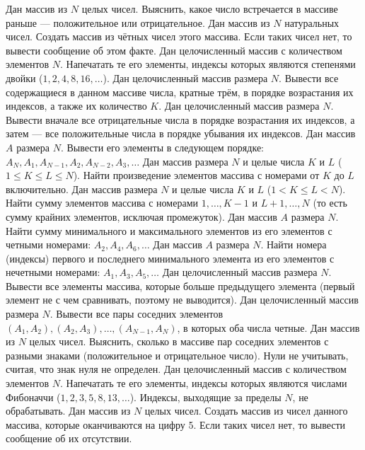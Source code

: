 Дан массив из $N$ целых чисел. Выяснить, какое число встречается в массиве раньше --- положительное или отрицательное.
Дан массив из $N$ натуральных чисел. Создать массив из чётных чисел этого массива. Если таких чисел нет, то вывести сообщение об этом факте.
Дан целочисленный массив с количеством элементов $N$. Напечатать те его элементы, индексы которых являются степенями двойки ($1, 2, 4, 8, 16, \dots$).
Дан целочисленный массив размера $N$. Вывести все содержащиеся в данном массиве числа, кратные трём, в порядке возрастания их индексов, а также их количество $K$.
Дан целочисленный массив размера $N$. Вывести вначале все отрицательные числа в порядке возрастания их индексов, а затем --- все положительные числа в порядке убывания их индексов.
Дан массив $A$ размера $N$. Вывести его элементы в следующем порядке: $A_N, A_1, A_{N-1}, A_2, A_{N-2}, A_3, \dots$
Дан массив размера $N$ и целые числа $K$ и $L$ ($1 \leq K \leq L \leq N$). Найти произведение элементов массива с номерами от $K$ до $L$ включительно.
Дан массив размера $N$ и целые числа $K$ и $L$ ($1 < K \leq L < N$). Найти сумму элементов массива с номерами $1, \dots, K-1$ и $L+1, \dots, N$ (то есть сумму крайних элементов, исключая промежуток).
Дан массив $A$ размера $N$. Найти сумму минимального и максимального элементов из его элементов с четными номерами: $A_2, A_4, A_6, \dots$
Дан массив $A$ размера $N$. Найти номера (индексы) первого и последнего минимального элемента из его элементов с нечетными номерами: $A_1, A_3, A_5, \dots$
Дан целочисленный массив размера $N$. Вывести все элементы массива, которые больше предыдущего элемента (первый элемент не с чем сравнивать, поэтому не выводится).
Дан целочисленный массив размера $N$. Вывести все пары соседних элементов $(A_1, A_2), (A_2, A_3), \dots, (A_{N-1}, A_N)$, в которых оба числа четные.
Дан массив из $N$ целых чисел. Выяснить, сколько в массиве пар соседних элементов с разными знаками (положительное и отрицательное число). Нули не учитывать, считая, что знак нуля не определен.
Дан целочисленный массив с количеством элементов $N$. Напечатать те его элементы, индексы которых являются числами Фибоначчи ($1, 2, 3, 5, 8, 13, \dots$). Индексы, выходящие за пределы $N$, не обрабатывать.
Дан массив из $N$ целых чисел. Создать массив из чисел данного массива, которые оканчиваются на цифру 5. Если таких чисел нет, то вывести сообщение об их отсутствии.
